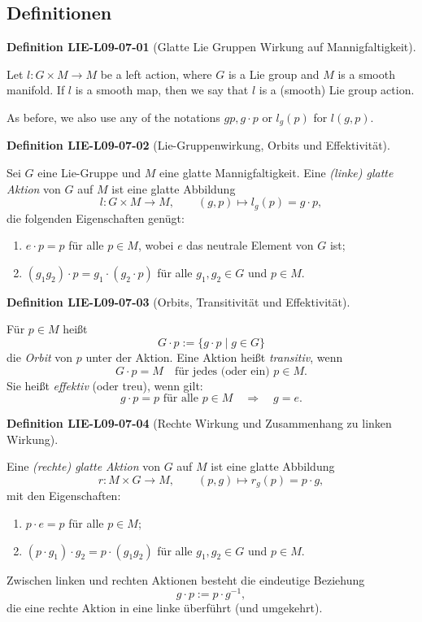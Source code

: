 \documentclass[10pt, letterpaper]{article}
\newcommand{\CustomHeading}[3]{%
  \par\medskip\noindent%
  \textbf{#1 #2} \textnormal{(#3)}.\enskip%
}
\newenvironment{DEF}[2]{\CustomHeading{Definition}{#1}{#2}}{}
\begin{document}
\subsection{Definitionen}

\begin{DEF}{LIE-L09-07-01}{Glatte Lie Gruppen Wirkung auf Mannigfaltigkeit}
Let $l: G \times M \rightarrow M$ be a left action, where $G$ is a Lie group and $M$ is a smooth manifold. If $l$ is a smooth map, then we say that $l$ is a (smooth) Lie group action.

As before, we also use any of the notations $g p, g \cdot p$ or $l_{g}(p)$ for $l(g, p)$.
\end{DEF}

\begin{DEF}{LIE-L09-07-02}{Lie-Gruppenwirkung, Orbits und Effektivität}
Sei $G$ eine Lie-Gruppe und $M$ eine glatte Mannigfaltigkeit.
Eine \emph{(linke) glatte Aktion} von $G$ auf $M$ ist eine glatte Abbildung
\[
l : G\times M \longrightarrow M,\qquad (g,p)\longmapsto l_g(p)=g\cdot p,
\]
die folgenden Eigenschaften genügt:
\begin{enumerate}[label=(\roman*)]
\item $e\cdot p=p$ für alle $p\in M$, wobei $e$ das neutrale Element von $G$ ist;
\item $(g_1g_2)\cdot p = g_1\cdot(g_2\cdot p)$ für alle $g_1,g_2\in G$ und $p\in M$.
\end{enumerate}
\end{DEF}

\begin{DEF}{LIE-L09-07-03}{Orbits, Transitivität und Effektivität}
Für $p\in M$ heißt
\[
G\cdot p := \{g\cdot p \mid g\in G\}
\]
die \emph{Orbit} von $p$ unter der Aktion.
Eine Aktion heißt \emph{transitiv}, wenn
\[
G\cdot p = M
\quad\text{für jedes (oder ein) }p\in M.
\]
Sie heißt \emph{effektiv} (oder treu), wenn gilt:
\[
g\cdot p = p\text{ für alle }p\in M
\quad\Longrightarrow\quad g=e.
\]
\end{DEF}

\begin{DEF}{LIE-L09-07-04}{Rechte Wirkung und Zusammenhang zu linken Wirkung}
Eine \emph{(rechte) glatte Aktion} von $G$ auf $M$ ist eine glatte Abbildung
\[
r : M\times G \longrightarrow M,\qquad (p,g)\longmapsto r_g(p)=p\cdot g,
\]
mit den Eigenschaften:
\begin{enumerate}[label=(\roman*)]
\item $p\cdot e = p$ für alle $p\in M$;
\item $(p\cdot g_1)\cdot g_2 = p\cdot(g_1g_2)$ für alle $g_1,g_2\in G$ und $p\in M$.
\end{enumerate}
Zwischen linken und rechten Aktionen besteht die eindeutige Beziehung
\[
g\cdot p := p\cdot g^{-1},
\]
die eine rechte Aktion in eine linke überführt (und umgekehrt).
\end{DEF}
\end{document}
